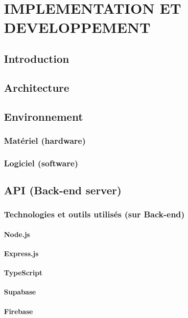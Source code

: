 \chapter{IMPLEMENTATION ET DEVELOPPEMENT}

\section{Introduction}
\section{Architecture}
\section{Environnement}
\subsection{Matériel (hardware)}
\subsection{Logiciel (software)}

\section{API (Back-end server)}
\subsection{Technologies et outils utilisés (sur Back-end)}
\subsubsection{Node.js}
\subsubsection{Express.js}
\subsubsection{TypeScript}
\subsubsection{Supabase}
\subsubsection{Firebase}
